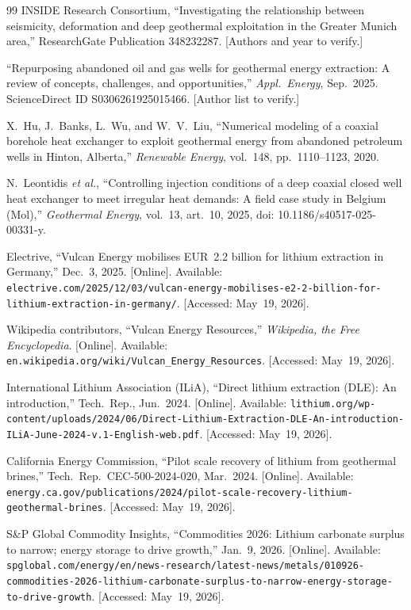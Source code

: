 \documentclass{article}
\begin{document}
\begin{thebibliography}{99}
INSIDE Research Consortium, ``Investigating the relationship between
seismicity, deformation and deep geothermal exploitation in the Greater
Munich area,'' ResearchGate Publication 348232287. [Authors and year to
verify.]

``Repurposing abandoned oil and gas wells for geothermal energy extraction:
A review of concepts, challenges, and opportunities,'' \emph{Appl.\ Energy},
Sep.\ 2025. ScienceDirect ID S0306261925015466. [Author list to verify.]

X.~Hu, J.~Banks, L.~Wu, and W.~V.~Liu, ``Numerical modeling of a coaxial
borehole heat exchanger to exploit geothermal energy from abandoned petroleum
wells in Hinton, Alberta,'' \emph{Renewable Energy}, vol.~148,
pp.~1110--1123, 2020.

N.~Leontidis \emph{et al.}, ``Controlling injection conditions of a deep
coaxial closed well heat exchanger to meet irregular heat demands: A field
case study in Belgium (Mol),'' \emph{Geothermal Energy}, vol.~13, art.~10,
2025, doi: 10.1186/s40517-025-00331-y.

Electrive, ``Vulcan Energy mobilises EUR~2.2 billion for lithium extraction
in Germany,'' Dec.~3, 2025. [Online]. Available:
\texttt{electrive.com/2025/12/03/vulcan-energy-mobilises-e2-2-billion-for-lithium-extraction-in-germany/}.
[Accessed: May~19, 2026].

Wikipedia contributors, ``Vulcan Energy Resources,'' \emph{Wikipedia, the Free
Encyclopedia}. [Online]. Available:
\texttt{en.wikipedia.org/wiki/Vulcan\_Energy\_Resources}.
[Accessed: May~19, 2026].

International Lithium Association (ILiA), ``Direct lithium extraction
(DLE): An introduction,'' Tech.\ Rep., Jun.\ 2024. [Online]. Available:
\texttt{lithium.org/wp-content/uploads/2024/06/Direct-Lithium-Extraction-DLE-An-introduction-ILiA-June-2024-v.1-English-web.pdf}.
[Accessed: May~19, 2026].

California Energy Commission, ``Pilot scale recovery of lithium from
geothermal brines,'' Tech.\ Rep.\ CEC-500-2024-020, Mar.\ 2024. [Online].
Available:
\texttt{energy.ca.gov/publications/2024/pilot-scale-recovery-lithium-geothermal-brines}.
[Accessed: May~19, 2026].

S\&P Global Commodity Insights, ``Commodities 2026: Lithium carbonate surplus
to narrow; energy storage to drive growth,'' Jan.~9, 2026. [Online].
Available:
\texttt{spglobal.com/energy/en/news-research/latest-news/metals/010926-commodities-2026-lithium-carbonate-surplus-to-narrow-energy-storage-to-drive-growth}.
[Accessed: May~19, 2026].


\end{thebibliography}
\end{document}
